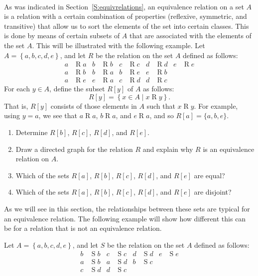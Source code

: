 \begin{previewactivity} \label{PA:setswithrelation} \hfill \\
As was indicated in Section~\ref{S:equivrelations}, an equivalence relation on a set $A$ is a relation with a certain combination of properties (reflexive, symmetric, and transitive) that allow us to sort the elements of the set into certain classes.  This is done by means of certain subsets of $A$ that are associated with the elements of the set $A$.  This will be illustrated with the following example.  Let 
$A = \left\{ {a, b, c, d, e} \right\}$, and  let $R$ be the relation on the set $A$ defined as follows:  %
\begin{align*}
a &\mathrel{R} a  &b &\mathrel{R} b  &c &\mathrel{R} c  &d &\mathrel{R} d   &e &\mathrel{R} e \\
a &\mathrel{R} b  &b &\mathrel{R} a  &b &\mathrel{R} e  &e &\mathrel{R} b    \\
a &\mathrel{R} e  &e &\mathrel{R} a  &c &\mathrel{R} d  &d &\mathrel{R} c 
\end{align*}
For each $y \in A$, define the subset $R[y]$ of $A$ as follows:
\[
R[y] = \left\{ x \in A \mid x \mathrel{R} y \right\}.
\]
That is, $R[y]$ consists of those elements in $A$ such that $x \mathrel{R} y$.  For example, using $y = a$, we see that $a \mathrel{R} a $, $b \mathrel{R} a$, and $e \mathrel{R} a$,  and so $R[a] = \{ a, b, e \}$.
\begin{enumerate}
  \item Determine $R[b]$, $R[c]$, $R[d]$, and $R[e]$.
  \item Draw a directed graph for the relation $R$ and explain why $R$ is an equivalence relation on $A$.
  \item Which of the sets  $R[ a ]$, $R[ b ]$, $R[ c ]$, $R[ d ]$,  and $R[ e ]$ are equal?
  \item Which of the sets  $R[ a ]$, $R[ b ]$, $R[ c ]$, $R[ d ]$,  and $R[ e ]$ are disjoint?
\end{enumerate}
As we will see in this section, the relationships between these sets are typical for an equivalence relation.  The following example will show how different this can be for a relation that is not an equivalence relation.

\noindent
Let  $A = \left\{ {a, b, c, d, e} \right\}$, and  let $S$ be the relation on the set $A$ defined as follows:
\begin{align*}
b &\mathrel{S} b  &c &\mathrel{S} c  &d &\mathrel{S} d   &e &\mathrel{S} e \\
a &\mathrel{S} b  &a &\mathrel{S} d  &b &\mathrel{S} c      \\
c &\mathrel{S} d  &d &\mathrel{S} c   
\end{align*}
%
%


\end{previewactivity}
